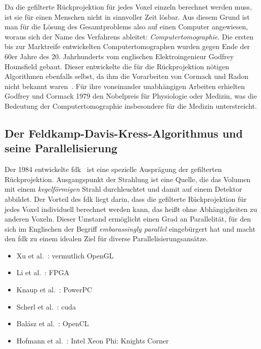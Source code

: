 Da die gefilterte Rückprojektion für jedes Voxel einzeln berechnet werden muss, ist sie für einen Menschen nicht in
sinnvoller Zeit lösbar. Aus diesem Grund ist man für die Lösung des Gesamtproblems also auf einen Computer angewiesen,
woraus sich der Name des Verfahrens ableitet: \textit{Computertomographie}. Die ersten bis zur Marktreife entwickelten
Computertomographen wurden gegen Ende der 60er Jahre des 20. Jahrhunderts vom englischen Elektroingenieur Godfrey
Hounsfield gebaut. Dieser entwickelte die für die Rückprojektion nötigen Algorithmen ebenfalls selbst, da ihm die
Vorarbeiten von Cormack und Radon nicht bekannt waren~\cite{kalender}. Für ihre voneinander unabhängigen Arbeiten
erhielten Godfrey und Cormack 1979 den Nobelpreis für Physiologie oder Medizin, was die Bedeutung der
Computertomographie insbesondere für die Medizin unterstreicht.

\subsection{Der Feldkamp-Davis-Kress-Algorithmus und seine Parallelisierung}

Der 1984 entwickelte \gls{fdk}~\cite{fdk} ist eine spezielle Ausprägung der gefilterten Rückprojektion. Ausgangspunkt
der Strahlung ist eine Quelle, die das Volumen mit einem \textit{kegelförmigen} Strahl durchleuchtet und damit auf einem
Detektor abbildet. Der Vorteil des \gls{fdk} liegt darin, dass die gefilterte Rückprojektion für jedes Voxel individuell
berechnet werden kann, das heißt ohne Abhängigkeiten zu anderen Voxeln. Dieser Umstand ermöglicht einen Grad an
Parallelität, für den sich im Englischen der Begriff \textit{embarassingly parallel} eingebürgert hat und macht den
\gls{fdk} zu einem idealen Ziel für diverse Parallelisierungsansätze.

\begin{itemize}
    \item Xu et al.~\cite{xumuell}: vermutlich OpenGL
    \item Li et al.~\cite{lipapa}: FPGA
    \item Knaup et al.~\cite{knaupsteck}: PowerPC
    \item Scherl et al.~\cite{scherlkeck}: \gls{cuda}
    \item Balász et al.~\cite{balgab}: OpenCL
    \item Hofmann et al.~\cite{hoftrei}: Intel{\textregistered} Xeon Phi{\texttrademark}: Knights Corner
\end{itemize}

